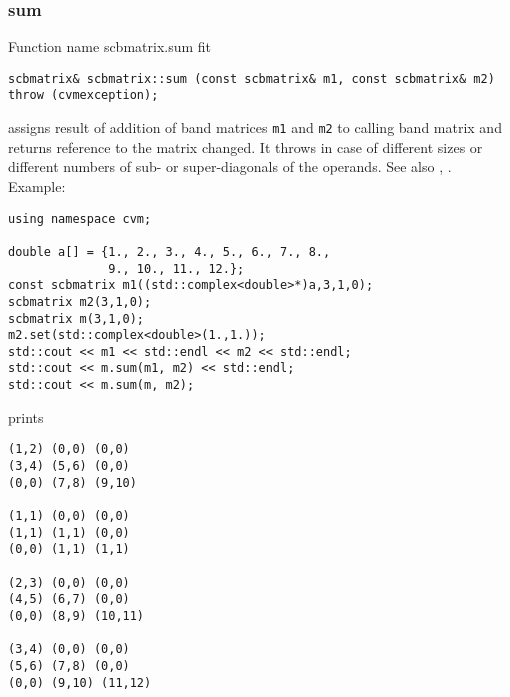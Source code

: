 \subsubsection{sum}
Function%
\pdfdest name {scbmatrix.sum} fit
\begin{verbatim}
scbmatrix& scbmatrix::sum (const scbmatrix& m1, const scbmatrix& m2)
throw (cvmexception);
\end{verbatim}
assigns  result of addition of
band matrices \verb"m1" and \verb"m2"  to  calling band matrix
and returns  reference to
the matrix changed.
It throws  
in case of different sizes or different numbers of sub- or super-diagonals
of the operands.
See also ,
.
Example:
\begin{Verbatim}
using namespace cvm;

double a[] = {1., 2., 3., 4., 5., 6., 7., 8.,
              9., 10., 11., 12.};
const scbmatrix m1((std::complex<double>*)a,3,1,0);
scbmatrix m2(3,1,0);
scbmatrix m(3,1,0);
m2.set(std::complex<double>(1.,1.));
std::cout << m1 << std::endl << m2 << std::endl;
std::cout << m.sum(m1, m2) << std::endl;
std::cout << m.sum(m, m2);
\end{Verbatim}
prints
\begin{Verbatim}
(1,2) (0,0) (0,0)
(3,4) (5,6) (0,0)
(0,0) (7,8) (9,10)

(1,1) (0,0) (0,0)
(1,1) (1,1) (0,0)
(0,0) (1,1) (1,1)

(2,3) (0,0) (0,0)
(4,5) (6,7) (0,0)
(0,0) (8,9) (10,11)

(3,4) (0,0) (0,0)
(5,6) (7,8) (0,0)
(0,0) (9,10) (11,12)
\end{Verbatim}
\newpage




